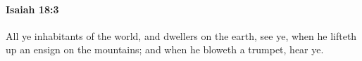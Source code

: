 
		\paragraph{Isaiah 18:3} %
			\label{ISAIAH-18-3}

			All ye inhabitants of the world, and dwellers on the earth, see ye, when he lifteth up an ensign on the mountains; and when he bloweth a trumpet, hear ye.



